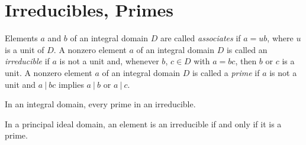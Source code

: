 \section{Irreducibles, Primes}

\begin{definition}
	Elements $a$ and $b$ of an integral domain $D$ are called \textit{associates} if $a = ub$, where $u$ is a unit of $D$. A nonzero element $a$ of an integral domain $D$ is called an \textit{irreducible} if $a$ is not a unit and, whenever $b$, $c \in D$ with $a = bc$, then $b$ or $c$ is a unit. A nonzero element $a$ of an integral domain $D$ is called a \textit{prime} if $a$ is not a unit and $a\ \vert\ bc$ implies $a\ \vert\ b$ or $a\ \vert\ c$.
\end{definition}

\begin{theorem}
	In an integral domain, every prime in an irreducible.
\end{theorem}

\begin{theorem}
	In a principal ideal domain, an element is an irreducible if and only if it is a prime.
\end{theorem}
